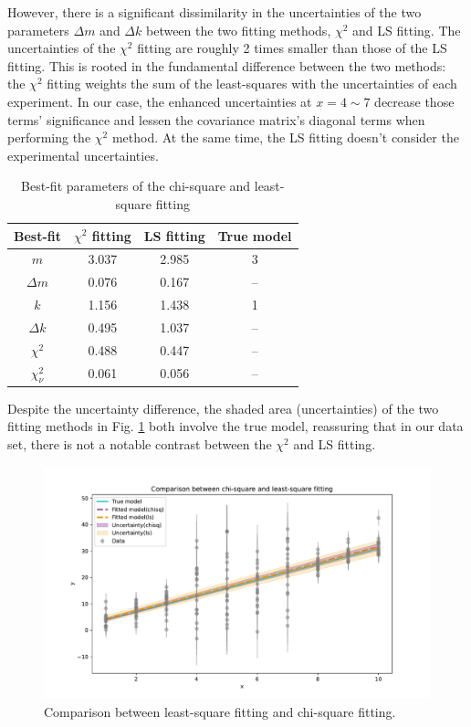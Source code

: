 \documentclass[12pt,a4paper]{article}
\begin{document}
\begin{CJK}{UTF8}{bkai}
However, there is a significant dissimilarity in the uncertainties of the two parameters $\Delta m$ and $\Delta k$ between the two fitting methods, $\chi^2$ and LS fitting. The uncertainties of the $\chi^2$ fitting are roughly 2 times smaller than those of the LS fitting.  This is rooted in the fundamental difference between the two methods: the $\chi^2$ fitting weights the sum of the least-squares with the uncertainties of each experiment. In our case, the enhanced uncertainties at $x=4\sim7$ decrease those terms' significance and lessen the covariance matrix's diagonal terms when performing the $\chi^2$ method. At the same time, the LS fitting doesn't consider the experimental uncertainties.

\begin{table}[h]
\centering
\caption{Best-fit parameters of the chi-square and least-square fitting}
\vspace{0.5cm}
\large{
\begin{tabular}{c||c c:c}
Best-fit        &   $\chi^2$ fitting      &   LS fitting    &   True model\\\hline\hline
$m$             &   3.037   &   2.985   &   3\\
$\Delta m$      &   0.076   &   0.167   &   --\\
$k$             &   1.156   &   1.438   &   1\\
$\Delta k$      &   0.495   &   1.037   &   --\\
$\chi^2$        &   0.488   &   0.447   &   --\\
$\chi_{\nu}^2$  &   0.061   &   0.056   &   --
\end{tabular}
}
\label{tab:best_fit}
\end{table}
\clearpage
Despite the uncertainty difference, the shaded area (uncertainties) of the two fitting methods in Fig. \ref{fig:output_1_2} both involve the true model, reassuring that in our data set, there is not a notable contrast between the $\chi^2$ and LS fitting.

\begin{figure}[h]
    \centering
    \includegraphics[width=1\linewidth]{figures/output/output_1_2.pdf}
    \caption{Comparison between least-square fitting and chi-square fitting.}
    \label{fig:output_1_2}
\end{figure}




\end{CJK}
\end{document}
